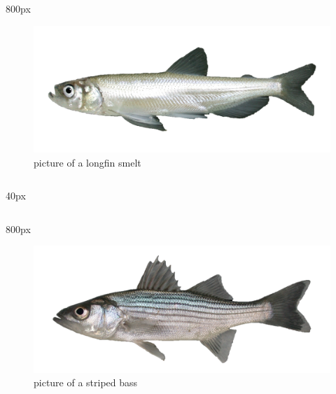 \documentclass[
]{book}
\begin{document}
\begin{column}{800px\textwidth}
\begin{figure}

{\centering \includegraphics[width=29.17in]{figures/longfin_smelt_adult} 

}

\caption{picture of a longfin smelt}\label{fig:unnamed-chunk-122}
\end{figure}
\end{column}

\begin{column}{40px\textwidth}
~
\end{column}

\begin{column}{800px\textwidth}
\begin{figure}

{\centering \includegraphics[width=29.17in]{figures/striped_bass_young_adult} 

}

\caption{picture of a striped bass}\label{fig:unnamed-chunk-123}
\end{figure}
\end{column}
\end{document}

